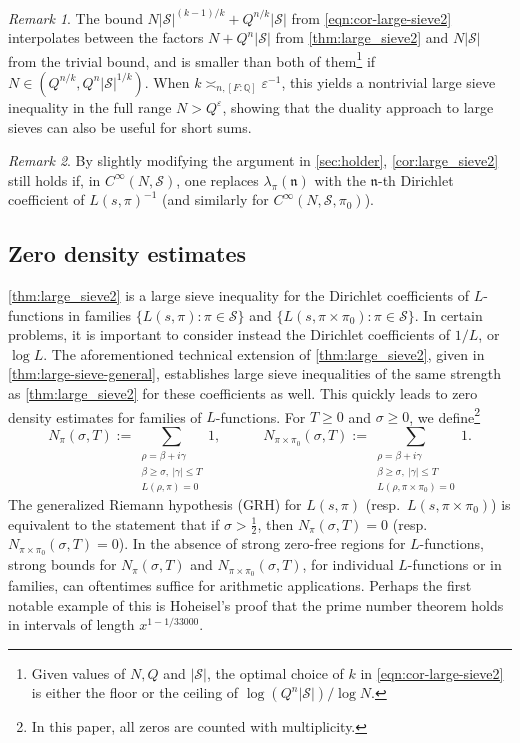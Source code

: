 \documentclass[11pt]{amsart}
\theoremstyle{remark}
\newtheorem*{remark}{Remark}
\numberwithin{equation}{section}
\newcommand{\kn}{\mathfrak{n}}
\newcommand{\Q}{\mathbb{Q}}
\newcommand{\mS}{\mathcal{S}}
\newcommand{\eps}{\varepsilon}
\begin{document}
\begin{remark}
The bound $N|\mS|^{(k-1)/k} + Q^{n/k}|\mS|$ from \eqref{eqn:cor-large-sieve2} interpolates between the factors $N + Q^n|\mS|$ from \cref{thm:large_sieve2} and $N|\mS|$ from the trivial bound, and is smaller than both of them\footnote{Given values of $N, Q$ and $|\mS|$, the optimal choice of $k$ in \eqref{eqn:cor-large-sieve2} is either the floor or the ceiling of $\log(Q^n |\mS|)/\log N$.} if $N \in (Q^{n/k}, Q^n |\mS|^{1/k})$. When $k \asymp_{n,[F:\Q]} \eps^{-1}$, this yields a nontrivial large sieve inequality in the full range $N > Q^\eps$, showing that the duality approach to large sieves can also be useful for short sums.
\end{remark}

\begin{remark} 
By slightly modifying the argument in \cref{sec:holder}, \cref{cor:large_sieve2} still holds if, in $C^\infty(N,\mathcal{S})$, one replaces $\lambda_\pi(\kn)$ with the $\kn$-th Dirichlet coefficient of $L(s, \pi)^{-1}$ (and similarly for $C^\infty(N,\mathcal{S}, \pi_0)$).
\end{remark}

\subsection{Zero density estimates}

\cref{thm:large_sieve2} is a large sieve inequality for the Dirichlet coefficients of $L$-functions in families $\{L(s,\pi)\colon\pi\in\mathcal{S}\}$ and $\{L(s,\pi\times\pi_0)\colon\pi\in\mathcal{S}\}$.  In certain problems, it is important to consider instead the Dirichlet coefficients of $1/L$, or $\log L$.  The aforementioned technical extension of \cref{thm:large_sieve2}, given in \cref{thm:large-sieve-general}, establishes large sieve inequalities of the same strength as \cref{thm:large_sieve2} for these coefficients as well.  This quickly leads to zero density estimates for families of $L$-functions. For $T\geq 0$ and $\sigma\geq 0$, we define\footnote{In this paper, all zeros are counted with multiplicity.}
\[
N_{\pi}(\sigma,T):=\sum_{\substack{ \rho=\beta+i\gamma\\ \beta\geq \sigma,~|\gamma|\leq T \\ L(\rho,\pi)=0}}1,\qquad\quad N_{\pi\times\pi_0}(\sigma,T):=\sum_{\substack{ \rho=\beta+i\gamma \\ \beta\geq \sigma,~|\gamma|\leq T \\ L(\rho,\pi\times\pi_0)=0}}1.
\]
The generalized Riemann hypothesis (GRH) for $L(s,\pi)$ (resp.\ $L(s,\pi\times\pi_0)$) is equivalent to the statement that if $\sigma>\frac{1}{2}$, then $N_{\pi}(\sigma,T)=0$ (resp.\ $N_{\pi\times\pi_0}(\sigma,T)=0$).  In the absence of strong zero-free regions for $L$-functions, strong bounds for $N_{\pi}(\sigma,T)$ and $N_{\pi\times\pi_0}(\sigma,T)$, for individual $L$-functions or in families, can oftentimes suffice for arithmetic applications.  Perhaps the first notable example of this is Hoheisel's proof \cite{Hoheisel} that the prime number theorem holds in intervals of length $x^{1-1/33000}$.
\end{document}
